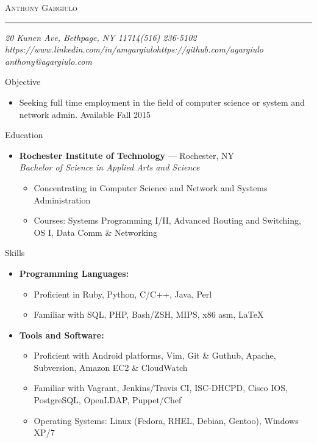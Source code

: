 \documentclass[10pt,oneside]{article}
\makeatletter
\newcommand{\name}{Anthony Gargiulo}
\newcommand{\addr}{20 Kunen Ave, Bethpage, NY 11714}
\newcommand{\mobilePhone}{(516) 236-5102}
\newcommand{\email}{anthony@agargiulo.com}
\newcommand{\github}{https://github.com/agargiulo}
\newcommand{\linkedin}{https://www.linkedin.com/in/amgargiulo}
\newcommand{\bigname}[1]{
	\begin{center}\fontfamily{ppl}\selectfont\Huge\scshape#1\end{center}
}
\newenvironment{ressection}[1]{
	\vspace{3pt}
	{\fontfamily{ppl}\selectfont\Large#1}
	\begin{itemize}
	\vspace{2pt}
}{
	\end{itemize}
}
\newcommand{\resitem}[1]{
	\vspace{-2pt}
	\item \begin{flushleft} #1 \end{flushleft}
}
\newcommand{\ressubitem}[1]{
	\vspace{-1pt}
	\item \begin{flushleft} #1 \end{flushleft}
}
\newcommand{\resbigitem}[3]{
	\vspace{-3pt}
	\item
	\textbf{#1} --- #2 \\
	\textit{#3}
}
\newenvironment{ressubsec}[3]{
	\resbigitem{#1}{#2}{#3}
	\vspace{-1pt}
	\begin{itemize}
}{
	\end{itemize}
}
\newenvironment{reslist}[1]{
	\resitem{\textbf{#1}}
	\vspace{-3pt}
	\begin{itemize}
}{
	\end{itemize}
}
\makeatother
\begin{document}
 \selectfont

\bigname{\name}

\vspace{-4pt} \rule{\textwidth}{1pt}

\vspace{-1pt} {\normalsize\itshape \addr \hfill \mobilePhone \\ \linkedin \hfill \github \\ \email}

\vspace{15 pt}



\begin{ressection}{Objective}

	\ressubitem{Seeking full time employment in the field of computer science or system and network admin. Available Fall 2015}

\end{ressection}


\begin{ressection}{Education}

	\begin{ressubsec}{Rochester Institute of Technology}{Rochester, NY}{Bachelor of Science in Applied Arts and Science}
		\ressubitem{Concentrating in Computer Science and Network and Systems Administration}
		\ressubitem{Courses: Systems Programming I/II, Advanced Routing and Switching, OS I, Data Comm \& Networking}
	\end{ressubsec}

\end{ressection}


\begin{ressection}{Skills}


	\begin{reslist}{Programming Languages:}
		\ressubitem{Proficient in Ruby, Python, C/C++, Java, Perl}
		\ressubitem{Familiar with SQL, PHP, Bash/ZSH, MIPS, x86 asm, \LaTeX}
	\end{reslist}

	\begin{reslist}{Tools and Software:}
		\ressubitem{Proficient with Android platforms, Vim, Git \& Guthub, Apache, Subversion, Amazon EC2 \& CloudWatch}
    \ressubitem{Familiar with Vagrant, Jenkins/Travis CI, ISC-DHCPD, Cisco IOS, PostgreSQL, OpenLDAP, Puppet/Chef}
		\ressubitem{Operating Systems: Linux (Fedora, RHEL, Debian, Gentoo), Windows XP/7}
	\end{reslist}

\end{ressection}
\end{document}
